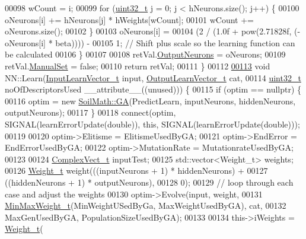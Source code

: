 \begin{DoxyCode}
00098     wCount = i;
00099     \textcolor{keywordflow}{for} (\hyperlink{_soil_math_types_8h_a435d1572bf3f880d55459d9805097f62}{uint32\_t} j = 0; j < hNeurons.size(); j++) \{
00100       oNeurons[i] += hNeurons[j] * hWeights[wCount];
00101       wCount += oNeurons.size();
00102     \}
00103     oNeurons[i] =
00104         (2 / (1.0f + pow(2.71828f, (-oNeurons[i] * beta)))) -
00105         1; \textcolor{comment}{// Shift plus scale so the learning function can be calculated}
00106   \}
00107 
00108   retVal.\hyperlink{struct_predict__struct_aa0708cae93baa061f21452537e86d3bd}{OutputNeurons} = oNeurons;
00109   retVal.\hyperlink{struct_predict__struct_a9e16b308d69246f0954a4a9100fc0660}{ManualSet} = \textcolor{keyword}{false};
00110   \textcolor{keywordflow}{return} retVal;
00111 \}
00112 
\hypertarget{_n_n_8cpp_source_l00113}{}\hyperlink{class_soil_math_1_1_n_n_a8550b524ed096712bb2fad9fa57b8c8d}{00113} \textcolor{keywordtype}{void} NN::Learn(\hyperlink{_soil_math_types_8h_a45aa81992bf0ddf272907bd4fa0b96cf}{InputLearnVector\_t} input, \hyperlink{_soil_math_types_8h_a2d8b5a261688166d724b68addd8561e6}{OutputLearnVector\_t} cat,
00114                \hyperlink{_soil_math_types_8h_a435d1572bf3f880d55459d9805097f62}{uint32\_t} noOfDescriptorsUsed \_\_attribute\_\_((unused))) \{
00115   \textcolor{keywordflow}{if} (optim == \textcolor{keyword}{nullptr}) \{
00116       optim = \textcolor{keyword}{new} \hyperlink{class_soil_math_1_1_g_a}{SoilMath::GA}(PredictLearn, inputNeurons, hiddenNeurons, outputNeurons);
00117     \}
00118   connect(optim, SIGNAL(learnErrorUpdate(\textcolor{keywordtype}{double})), \textcolor{keyword}{this}, SIGNAL(learnErrorUpdate(\textcolor{keywordtype}{double})));
00119 
00120   optim->Elitisme = ElitismeUsedByGA;
00121   optim->EndError = EndErrorUsedByGA;
00122   optim->MutationRate = MutationrateUsedByGA;
00123 
00124   \hyperlink{_soil_math_types_8h_a7567e521c2b2c408dcb62dbff72390f7}{ComplexVect\_t} inputTest;
00125   std::vector<Weight\_t> weights;
00126   \hyperlink{_soil_math_types_8h_ac56ad2b88186620fd0de0d213aa715dd}{Weight\_t} weight(((inputNeurons + 1) * hiddenNeurons) +
00127                       ((hiddenNeurons + 1) * outputNeurons),
00128                   0);
00129   \textcolor{comment}{// loop through each case and adjust the weights}
00130   optim->Evolve(input, weight,
00131                \hyperlink{_soil_math_types_8h_aaa919636507bcd52b19efa301aa80b9a}{MinMaxWeight\_t}(MinWeightUSedByGa, MaxWeightUsedByGA), cat,
00132                MaxGenUsedByGA, PopulationSizeUsedByGA);
00133 
00134   this->iWeights = \hyperlink{_soil_math_types_8h_ac56ad2b88186620fd0de0d213aa715dd}{Weight\_t}(

\end{DoxyCode}
